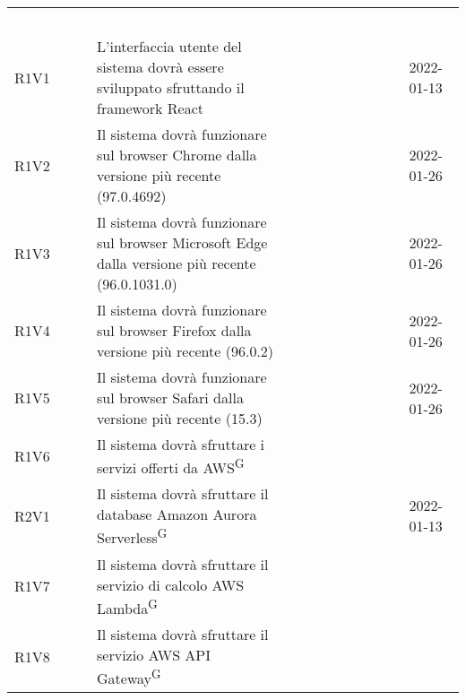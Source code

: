 

\renewcommand{\arraystretch}{1.5}
\begin{longtable}{ m{}<{\centering}  m{}<{\centering}  m{}<{\centering}  m{}<{\centering}}
	\rowcolor{darkblue}
	\textcolor{white}{\textbf{Requisito}} &\textcolor{white}{\textbf{Descrizione}}& \textcolor{white}{\textbf{Classificazione}} & \textcolor{white}{\textbf{Fonti}}\\ 

	R1V1 & L’interfaccia utente del sistema dovrà essere sviluppato sfruttando il framework React & \Ob & \Vi{} 2022-01-13 \\	

	R1V2 & Il sistema dovrà funzionare sul browser Chrome dalla versione più recente (97.0.4692) & \Ob & \Ve{} 2022-01-26 \\	
	 
	R1V3 & Il sistema dovrà funzionare sul browser Microsoft Edge dalla versione più recente (96.0.1031.0) & \Ob & \Ve{} 2022-01-26 \\	

	R1V4 & Il sistema dovrà funzionare sul browser Firefox dalla versione più recente (96.0.2) & \Ob & \Ve{} 2022-01-26 \\	
	 
	R1V5 & Il sistema dovrà funzionare sul browser Safari dalla versione più recente (15.3) & \Ob & \Ve{} 2022-01-26 \\	
	 
	R1V6 & Il sistema dovrà sfruttare i servizi offerti da AWS\textsuperscript{G} & \Ob & \Ca \\	
	 
	R2V1 & Il sistema dovrà sfruttare il database Amazon Aurora Serverless\textsuperscript{G} & \De & \Vi{} 2022-01-13 \\
	
	R1V7 & Il sistema dovrà sfruttare il servizio di calcolo AWS Lambda\textsuperscript{G} & \Ob & \Ca \\	
	 
	R1V8 & Il sistema dovrà sfruttare il servizio AWS API Gateway\textsuperscript{G} & \Ob & \Ca \\
	

\end{longtable}
